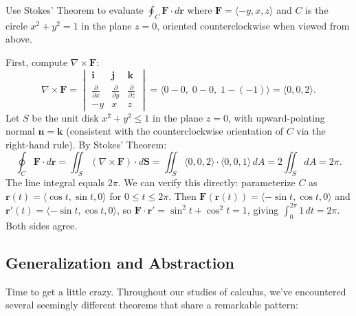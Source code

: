 \exampleline
\begin{example}
Use Stokes' Theorem to evaluate \( \oint_C \mathbf{F} \cdot d\mathbf{r} \) where \( \mathbf{F} = \langle -y, x, z \rangle \) and \( C \) is the circle \( x^2 + y^2 = 1 \) in the plane \( z = 0 \), oriented counterclockwise when viewed from above.

\begin{solution}
First, compute \( \nabla \times \mathbf{F} \):
\[
\nabla \times \mathbf{F} = \begin{vmatrix} \mathbf{i} & \mathbf{j} & \mathbf{k} \\ \frac{\partial}{\partial x} & \frac{\partial}{\partial y} & \frac{\partial}{\partial z} \\ -y & x & z \end{vmatrix} = \langle 0 - 0, \; 0 - 0, \; 1 - (-1) \rangle = \langle 0, 0, 2 \rangle.
\]
Let \( S \) be the unit disk \( x^2 + y^2 \leq 1 \) in the plane \( z = 0 \), with upward-pointing normal \( \mathbf{n} = \mathbf{k} \) (consistent with the counterclockwise orientation of \( C \) via the right-hand rule). By Stokes' Theorem:
\[
\oint_C \mathbf{F} \cdot d\mathbf{r} = \iint_S (\nabla \times \mathbf{F}) \cdot d\mathbf{S} = \iint_S \langle 0, 0, 2 \rangle \cdot \langle 0, 0, 1 \rangle \, dA = 2 \iint_S dA = 2\pi.
\]
\noindent The line integral equals \( 2\pi \). We can verify this directly: parameterize \( C \) as \( \mathbf{r}(t) = \langle \cos t, \sin t, 0 \rangle \) for \( 0 \leq t \leq 2\pi \). Then \( \mathbf{F}(\mathbf{r}(t)) = \langle -\sin t, \cos t, 0 \rangle \) and \( \mathbf{r}'(t) = \langle -\sin t, \cos t, 0 \rangle \), so \( \mathbf{F} \cdot \mathbf{r}' = \sin^2 t + \cos^2 t = 1 \), giving \( \int_0^{2\pi} 1 \, dt = 2\pi \). Both sides agree.
\end{solution}
\end{example}
\exampleline

\subsection*{Generalization and Abstraction}

\noindent Time to get a little crazy. Throughout our studies of calculus, we've encountered several seemingly different theorems that share a remarkable pattern:

